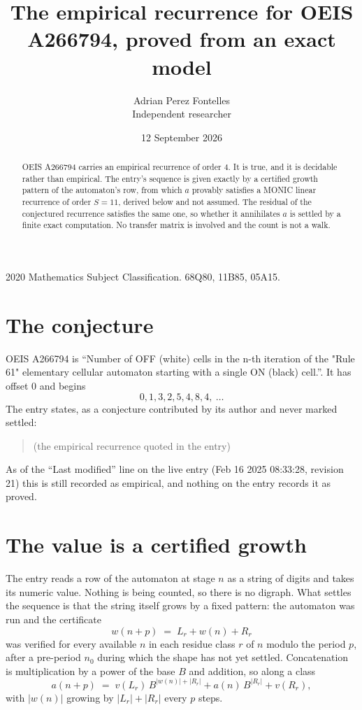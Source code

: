 \documentclass[11pt,a4paper]{article}
\title{The empirical recurrence for OEIS A266794, proved from an exact model}
\author{Adrian Perez Fontelles\\ \small Independent researcher}
\date{12 September 2026}
\theoremstyle{plain}
\theoremstyle{definition}
\begin{document}
\maketitle

\begin{abstract}
OEIS A266794 carries an empirical recurrence of order $4$. It is true, and it is
decidable rather than empirical. The entry's sequence is given exactly by a certified growth pattern of the automaton's row, from
which $a$ provably satisfies a MONIC linear recurrence of order $S=11$, derived below and not
assumed. The residual of the conjectured recurrence satisfies the same one, so whether it
annihilates $a$ is settled by a finite exact computation. No transfer matrix is involved and
the count is not a walk.
\end{abstract}

\noindent\small 2020 Mathematics Subject Classification. 68Q80, 11B85, 05A15.\normalsize

\section{The conjecture}

OEIS A266794 is ``Number of OFF (white) cells in the n-th iteration of the "Rule 61" elementary cellular automaton starting with a single ON (black) cell.''. It has offset $0$ and begins
\[
0, 1, 3, 2, 5, 4, 8, 4,\ \dots
\]
The entry states, as a conjecture contributed by its author and never marked settled:
\begin{quote}
(the empirical recurrence quoted in the entry)
\end{quote}
As of the ``Last modified'' line on the live entry (Feb 16 2025 08:33:28, revision 21)
this is still recorded as empirical, and nothing on the entry records it as proved.

\section{The value is a certified growth}

The entry reads a row of the automaton at stage $n$ as a string of digits and takes its
numeric value. Nothing is being counted, so there is no digraph. What settles the sequence is
that the string itself grows by a fixed pattern: the automaton was run and the certificate
\[
w(n+p)\;=\;L_r + w(n) + R_r
\]
was verified for every available $n$ in each residue class $r$ of $n$ modulo the period $p$,
after a pre-period $n_0$ during which the shape has not yet settled. Concatenation is
multiplication by a power of the base $B$ and addition, so along a class
\[
a(n+p)\;=\;v(L_r)\,B^{|w(n)|+|R_r|} + a(n)\,B^{|R_r|} + v(R_r),
\]
with $|w(n)|$ growing by $|L_r|+|R_r|$ every $p$ steps.
\end{document}

